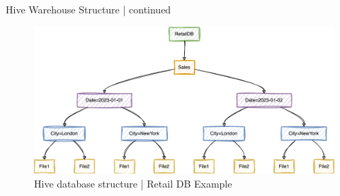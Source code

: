 \begin{frame}[fragile]{Hive Warehouse Structure | continued}


\begin{figure}
	\includegraphics[width=\textwidth,height=.65\textheight]{./Figures/chapter-03/mermaid-diagram-retail_db.png}
	
	\caption{Hive database structure | Retail DB Example}	
\end{figure}
\end{frame}
